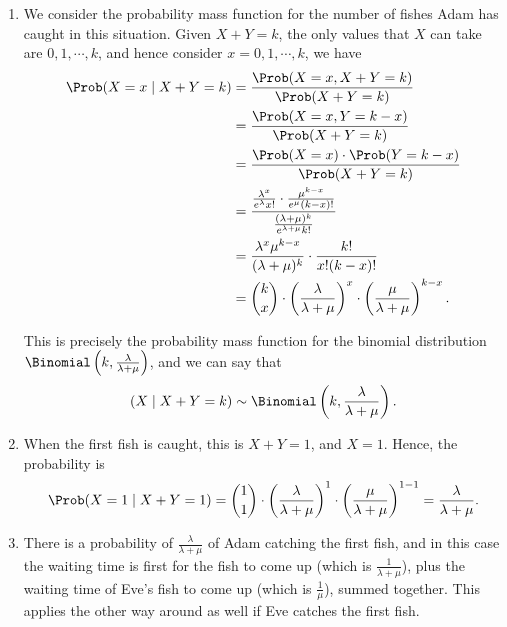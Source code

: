 \begin{enumerate}
    \item We consider the probability mass function for the number of fishes Adam has caught in this situation. Given \(X + Y = k\), the only values that \(X\) can take are \(0, 1, \cdots, k\), and hence consider \(x = 0,1, \cdots, k\), we have
          \begin{align*}
              \Prob(X = x \mid X + Y = k) & = \frac{\Prob (X = x, X + Y = k)}{\Prob(X + Y = k)}                                                                                    \\
                                          & = \frac{\Prob(X = x, Y = k - x)}{\Prob(X + Y = k)}                                                                                     \\
                                          & = \frac{\Prob(X = x) \cdot \Prob(Y = k - x)}{\Prob(X + Y = k)}                                                                         \\
                                          & = \frac{\frac{\lambda^x}{e^{\lambda} x!} \cdot \frac{\mu^{k - x}}{e^{\mu} (k - x)!}}{\frac{(\lambda + \mu)^{k}}{e^{\lambda + \mu} k!}} \\
                                          & = \frac{\lambda^x \mu^{k - x}}{(\lambda + \mu)^{k}} \cdot \frac{k!}{x! (k - x)!}                                                       \\
                                          & = \binom{k}{x} \cdot \left(\frac{\lambda}{\lambda + \mu}\right)^{x} \cdot \left(\frac{\mu}{\lambda + \mu}\right)^{k - x}.
          \end{align*}

          This is precisely the probability mass function for the binomial distribution \(\Binomial\left(k, \frac{\lambda}{\lambda + \mu}\right)\), and we can say that
          \[
              \left(X \mid X + Y = k\right) \sim \Binomial\left(k, \frac{\lambda}{\lambda + \mu}\right).
          \]

    \item When the first fish is caught, this is \(X + Y = 1\), and \(X = 1\). Hence, the probability is
          \[
              \Prob(X = 1 \mid X + Y = 1) = \binom{1}{1} \cdot \left(\frac{\lambda}{\lambda + \mu}\right)^{1} \cdot \left(\frac{\mu}{\lambda + \mu}\right)^{1 - 1} = \frac{\lambda}{\lambda + \mu}.
          \]

    \item There is a probability of \(\frac{\lambda}{\lambda + \mu}\) of Adam catching the first fish, and in this case the waiting time is first for the fish to come up (which is \(\frac{1}{\lambda + \mu}\)), plus the waiting time of Eve's fish to come up (which is \(\frac{1}{\mu}\)), summed together. This applies the other way around as well if Eve catches the first fish.


\end{enumerate}
